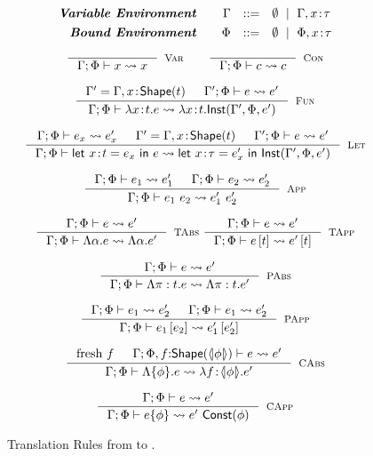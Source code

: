 \begin{figure}[p]
\centering
\captionsetup{justification=centering}
$$
\begin{array}{rrcl}
\centering
 \emphbf{Variable Environment} \quad 
   & \cenv & ::=
   & \emptyset \spmid  \EXT{\cenv}{x}{\utyp}
   \\[0.05in]
 
 \emphbf{Bound Environment} \quad 
   & \benv & ::=
   & \emptyset \spmid  \EXT{\benv}{x}{\utyp}
\end{array}
$$

$$
\inference{
}{
	\txexpr{\cenv}{\benv}{x}{x}
}[\txVar]
\qquad
\inference{
}{
	\txexpr{\cenv}{\benv}{c}{c}
}[\txCon]
$$

$$
\inference{
	\cenv' = \EXT{\cenv}{x}{\toshape{\rtyp}} && \txexpr{\cenv'}{\benv}{e}{e'} 
}{
	\txexpr{\cenv}{\benv}{\efunt{x}{\rtyp}{e}}{\efunt{x}{\rtyp}{\closure{\cenv'}{\benv}{e'}{x\colon\rtyp}}}
}[\txFun]
$$
 
$$
\inference{
	\txexpr{\cenv}{\benv}{e_x}{e_x'} && \cenv' = \EXT{\cenv}{x}{\toshape{\rtyp}} &&
	\txexpr{\cenv'}{\benv}{e}{e'}
}{
	\txexpr{\cenv}{\benv}{\elet{x}{e_x}{e}{\rtyp}}
	{\elet{x}{e_x'}{\closure{\cenv'}{\benv}{e'}}{\tau}{x\colon\rtyp}}
}[\txLet]
$$

$$
\inference{
	\txexpr{\cenv}{\benv}{e_1}{e_1'} &&
	\txexpr{\cenv}{\benv}{e_2}{e_2'}
}{
	\txexpr{\cenv}{\benv}{\eapp{e_1}{e_2}}{\eapp{e_1'}{e_2'}}
}[\txApp]
$$

$$
\inference{
	\txexpr{\cenv}{\benv}{e}{e'}
}{
	\txexpr{\cenv}{\benv}{\etabs{\alpha}{e}}{\etabs{\alpha}{e'}}
}[\txTAbs]
\
\inference{
	\txexpr{\cenv}{\benv}{e}{e'}
}{
	\txexpr{\cenv}{\benv}{\etapp{e}{\rtyp}}{\etapp{e'}{\rtyp}}
}[\txTApp]
$$

$$
\inference{
	\txexpr{\cenv}{\benv}{e}{e'}
}{
	\txexpr{\cenv}{\benv}{\epabs{\rvar}{\rtyp}{e}}{\epabs{\rvar}{\rtyp}{e'}}
}[\txPAbs]
$$
 
$$
\inference{
	\txexpr{\cenv}{\benv}{e_1}{e_2'} &&
	\txexpr{\cenv}{\benv}{e_1}{e_2'}
}{
	\txexpr{\cenv}{\benv}{\epapp{e_1}{e_2}}{\epapp{e_1'}{e_2'}}
}[\txPApp]
$$
 
$$
\inference{
	\text{fresh}\ f &&
	\txexpr{\cenv}{\benv, f\colon\toshape{\txbound{\constraint}}}{e}{e'}
}{
	\txexpr{\cenv}{\benv}{\econstraint{\constraint}{e} }{\efunt{f}{\txbound{\constraint}}{e'}}
}[\txCAbs]
$$

$$
\inference{
	\txexpr{\cenv}{\benv}{e}{e'}
}{
	\txexpr{\cenv}{\benv}{\econstantconstraint{e}{\constraint}}{\eapp{e'}{\ctofun{\constraint}}}
}[\txCApp]
$$
\caption{Translation Rules from \boundedcorelan to  \corelan.}
\label{fig:translation}
\end{figure}

